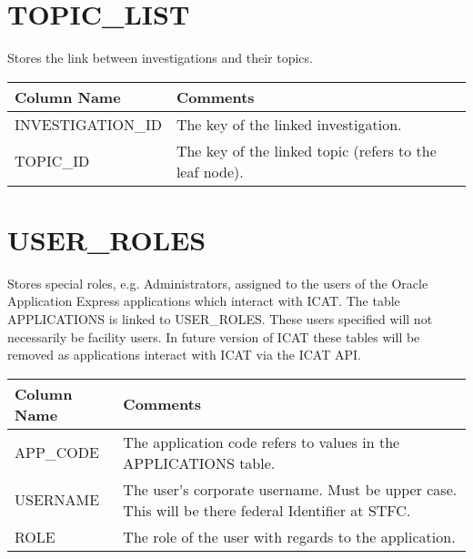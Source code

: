 \documentclass{report}
\begin{document}
\section{TOPIC\_LIST}

Stores the link between investigations and their topics.\\

\begin{tabular}{|l|l|}
\hline
Column Name & Comments \\ \hline
INVESTIGATION\_ID & \multicolumn{1}{p{100mm}|}{
The key of the linked investigation.} \\ \hline
TOPIC\_ID & \multicolumn{1}{p{100mm}|}{
The key of the linked topic (refers to the leaf node).} \\ \hline
\end{tabular}
\section{USER\_ROLES}

Stores special roles, e.g. Administrators, assigned to the users of the Oracle Application Express applications which interact with ICAT. The table APPLICATIONS is linked to USER\_ROLES. These users specified will not necessarily be facility users. In future version of ICAT these tables will be removed as applications interact with ICAT via the ICAT API.\\

\begin{tabular}{|l|l|}
\hline
Column Name & Comments \\ \hline
APP\_CODE & \multicolumn{1}{p{100mm}|}{
The application code refers to values in the APPLICATIONS table.} \\ \hline
USERNAME & \multicolumn{1}{p{100mm}|}{
The user's corporate username.	Must be upper case. This will be there federal Identifier at STFC.} \\ \hline
ROLE & \multicolumn{1}{p{100mm}|}{
The role of the user with regards to the application.} \\ \hline
\end{tabular}
\end{document}
